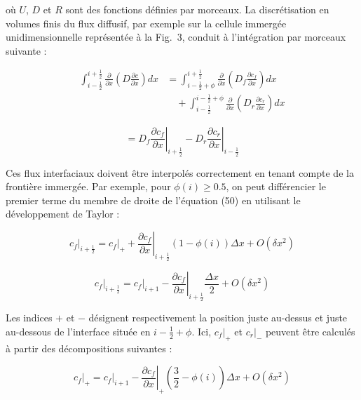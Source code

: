 \documentclass[12pt,a4paper]{report}
\begin{document}
où $U$, $D$ et $R$ sont des fonctions définies par morceaux. La discrétisation en volumes finis du flux diffusif, par exemple sur la cellule immergée unidimensionnelle représentée à la Fig.~3, conduit à l’intégration par morceaux suivante :

\begin{align}
\int_{i-\frac{1}{2}}^{i+\frac{1}{2}} 
\frac{\partial}{\partial x}
\left(
D \frac{\partial c}{\partial x}
\right) dx
&=
\int_{i-\frac{1}{2}+\phi}^{i+\frac{1}{2}}
\frac{\partial}{\partial x}
\left(
D_f \frac{\partial c_f}{\partial x}
\right) dx \nonumber \\
&\quad +
\int_{i-\frac{1}{2}}^{i-\frac{1}{2}+\phi}
\frac{\partial}{\partial x}
\left(
D_r \frac{\partial c_r}{\partial x}
\right) dx
\tag{49}
\end{align}

\begin{equation}
=
D_f \left.\frac{\partial c_f}{\partial x}\right|_{i+\frac{1}{2}}
-
D_r \left.\frac{\partial c_r}{\partial x}\right|_{i-\frac{1}{2}}
\tag{50}
\end{equation}

Ces flux interfaciaux doivent être interpolés correctement en tenant compte de la frontière immergée. Par exemple, pour $\phi(i)\geq 0.5$, on peut différencier le premier terme du membre de droite de l’équation (50) en utilisant le développement de Taylor :

\begin{equation}
c_f\Big|_{i+\frac{1}{2}}
=
c_f\Big|_{+}
+
\left.
\frac{\partial c_f}{\partial x}
\right|_{i+\frac{1}{2}}
(1-\phi(i))\Delta x
+
O(\delta x^2)
\tag{51}
\end{equation}

\begin{equation}
c_f\Big|_{i+\frac{1}{2}}
=
c_f\Big|_{i+1}
-
\left.
\frac{\partial c_f}{\partial x}
\right|_{i+\frac{1}{2}}
\frac{\Delta x}{2}
+
O(\delta x^2)
\tag{52}
\end{equation}

Les indices $+$ et $-$ désignent respectivement la position juste au-dessus et juste au-dessous de l’interface située en $i-\frac{1}{2}+\phi$.
Ici, $c_f|_+$ et $c_r|_-$ peuvent être calculés à partir des décompositions suivantes :

\begin{equation}
c_f\Big|_{+}
=
c_f\Big|_{i+1}
-
\left.
\frac{\partial c_f}{\partial x}
\right|_{+}
\left(
\frac{3}{2}-\phi(i)
\right)\Delta x
+
O(\delta x^2)
\tag{53}
\end{equation}
\end{document}
